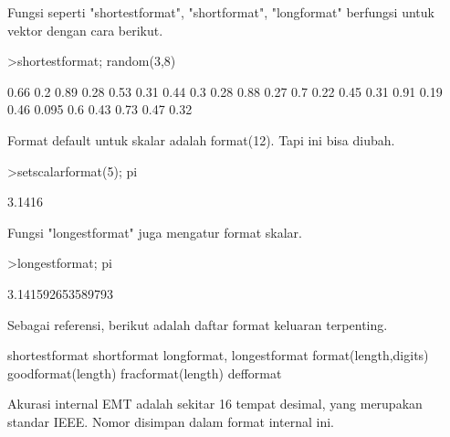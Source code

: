 \begin{eulernotebook}
\begin{eulercomment}
Fungsi seperti "shortestformat", "shortformat", "longformat" berfungsi
untuk vektor dengan cara berikut.
\end{eulercomment}
\begin{eulerprompt}
>shortestformat; random(3,8)
\end{eulerprompt}
\begin{euleroutput}
    0.66    0.2   0.89   0.28   0.53   0.31   0.44    0.3 
    0.28   0.88   0.27    0.7   0.22   0.45   0.31   0.91 
    0.19   0.46  0.095    0.6   0.43   0.73   0.47   0.32 
\end{euleroutput}
\begin{eulercomment}
Format default untuk skalar adalah format(12). Tapi ini bisa diubah.
\end{eulercomment}
\begin{eulerprompt}
>setscalarformat(5); pi
\end{eulerprompt}
\begin{euleroutput}
  3.1416
\end{euleroutput}
\begin{eulercomment}
Fungsi "longestformat" juga mengatur format skalar.
\end{eulercomment}
\begin{eulerprompt}
>longestformat; pi
\end{eulerprompt}
\begin{euleroutput}
  3.141592653589793
\end{euleroutput}
\begin{eulercomment}
Sebagai referensi, berikut adalah daftar format keluaran terpenting.

\end{eulercomment}
\begin{eulerttcomment}
 shortestformat shortformat longformat, longestformat
 format(length,digits) goodformat(length)
 fracformat(length)
 defformat
\end{eulerttcomment}
\begin{eulercomment}

Akurasi internal EMT adalah sekitar 16 tempat desimal, yang merupakan
standar IEEE. Nomor disimpan dalam format internal ini.



\end{eulercomment}
\end{eulernotebook}
